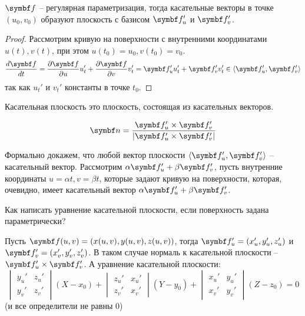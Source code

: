 \documentclass[main]{subfiles}
\begin{document}
\begin{theorem}
    $\vf$ -- регулярная параметризация, тогда касательные векторы в точке $(u_0, v_0)$ образуют плоскость с базисом $\vf_u'$ и $\vf_v'$.
\end{theorem}
\begin{proof}
    Рассмотрим кривую на поверхности с внутренними координатами $u(t), v(t)$,
    при этом $u(t_0) =u_0, v(t_0) = v_0$.
    \begin{gather*}
        \frac{d\vf}{dt} = \frac{\partial\vf}{\partial u} u_t' + \frac{\partial \vf}{\partial v} v_t' = \vf'_u u'_t + \vf_v' v_t' \in \langle \vf_u', \vf_v'\rangle
    \end{gather*}
    так как $u_t'$ и $v_t'$ константы в точке $t_0$.
\end{proof}
\begin{definition}
    Касательная плоскость это плоскость, состоящая из касательных векторов.
\end{definition}
\begin{definition}
    \[\vn = \frac{\vf_u' \times \vf_v'}{|\vf_u' \times \vf_v'|}\]
\end{definition}

Формально докажем, что любой вектор плоскости $\langle \vf_u', \vf_v'\rangle$ -- касательный вектор.
Рассмотрим $\alpha \vf_u' + \beta \vf_v'$, пусть внутренние координаты $u = \alpha t, v = \beta t$,
которые задают кривую на поверхности, которая, очевидно, имеет касательный вектор $\alpha \vf_u' + \beta \vf_v'$.

Как написать уравнение касательной плоскости, если поверхность задана параметрически?

Пусть $\vf(u,v) = (x(u,v), y(u,v), z(u,v))$, тогда $\vf_u' = (x_u', y_u', z_u')$ и $\vf_v' = (x_v', y_v', z_v')$.
В таком случае нормаль к касательной плоскости -- $\vf_u' \times \vf_v'$.
А уравнение касательной плоскости:
\[\begin{vmatrix}
        y_u' & z_u' \\
        y_v' & z_v'
    \end{vmatrix} (X - x_0 ) +
    \begin{vmatrix}
        z_u' & x_u' \\
        z_v' & x_v'
    \end{vmatrix} (Y - y_0 ) +
    \begin{vmatrix}
        x_u' & y_u' \\
        x_v' & y_v'
    \end{vmatrix} (Z - z_0 ) = 0\]
(и все определители не равны 0)
\end{document}

